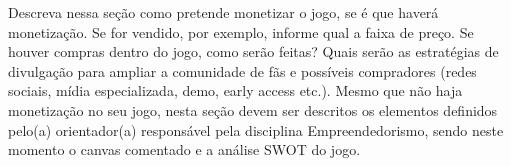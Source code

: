 Descreva nessa seção como pretende monetizar o jogo, se é que haverá monetização. Se for vendido, por exemplo, informe qual a faixa de preço. Se houver compras dentro do jogo, como serão feitas? Quais serão as estratégias de divulgação para ampliar a comunidade de fãs e possíveis compradores (redes sociais, mídia especializada, demo, early access etc.).
Mesmo que não haja monetização no seu jogo, nesta seção devem ser descritos os elementos definidos pelo(a) orientador(a) responsável pela disciplina Empreendedorismo, sendo neste momento o canvas comentado e a análise SWOT do jogo.
